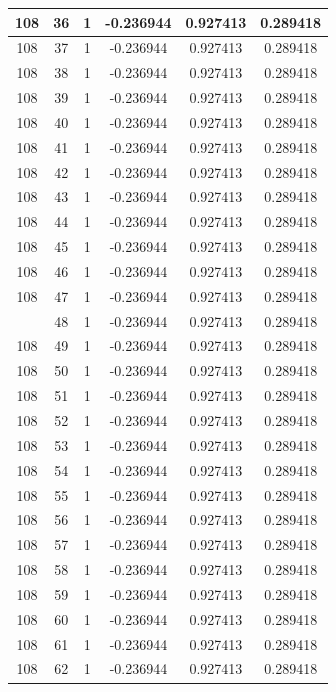 \documentclass[12pt,a4paper]{article}
\numberwithin{equation}{section}
\numberwithin{figure}{section}
\numberwithin{table}{section}
\begin{document}
\begin{longtable}{|c|c|c|c|c|c|}
108 & 36 & 1 & -0.236944 & 0.927413 & 0.289418 \\ \hline
108 & 37 & 1 & -0.236944 & 0.927413 & 0.289418 \\ \hline
108 & 38 & 1 & -0.236944 & 0.927413 & 0.289418 \\ \hline
108 & 39 & 1 & -0.236944 & 0.927413 & 0.289418 \\ \hline
108 & 40 & 1 & -0.236944 & 0.927413 & 0.289418 \\ \hline
108 & 41 & 1 & -0.236944 & 0.927413 & 0.289418 \\ \hline
108 & 42 & 1 & -0.236944 & 0.927413 & 0.289418 \\ \hline
108 & 43 & 1 & -0.236944 & 0.927413 & 0.289418 \\ \hline
108 & 44 & 1 & -0.236944 & 0.927413 & 0.289418 \\ \hline
108 & 45 & 1 & -0.236944 & 0.927413 & 0.289418 \\ \hline
108 & 46 & 1 & -0.236944 & 0.927413 & 0.289418 \\ \hline
108 & 47 & 1 & -0.236944 & 0.927413 & 0.289418 \\ \hline
\pagebreak
108 & 48 & 1 & -0.236944 & 0.927413 & 0.289418 \\ \hline
108 & 49 & 1 & -0.236944 & 0.927413 & 0.289418 \\ \hline
108 & 50 & 1 & -0.236944 & 0.927413 & 0.289418 \\ \hline
108 & 51 & 1 & -0.236944 & 0.927413 & 0.289418 \\ \hline
108 & 52 & 1 & -0.236944 & 0.927413 & 0.289418 \\ \hline
108 & 53 & 1 & -0.236944 & 0.927413 & 0.289418 \\ \hline
108 & 54 & 1 & -0.236944 & 0.927413 & 0.289418 \\ \hline
108 & 55 & 1 & -0.236944 & 0.927413 & 0.289418 \\ \hline
108 & 56 & 1 & -0.236944 & 0.927413 & 0.289418 \\ \hline
108 & 57 & 1 & -0.236944 & 0.927413 & 0.289418 \\ \hline
108 & 58 & 1 & -0.236944 & 0.927413 & 0.289418 \\ \hline
108 & 59 & 1 & -0.236944 & 0.927413 & 0.289418 \\ \hline
108 & 60 & 1 & -0.236944 & 0.927413 & 0.289418 \\ \hline
108 & 61 & 1 & -0.236944 & 0.927413 & 0.289418 \\ \hline
108 & 62 & 1 & -0.236944 & 0.927413 & 0.289418 \\ \hline

\end{longtable}
\end{document}
